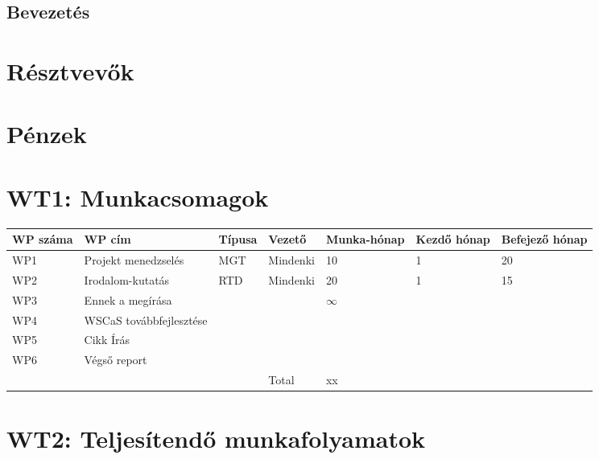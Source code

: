 \documentclass{report}
\begin{document}
\normalsize


\newpage
\subsection{Bevezetés}
\blindtext
\blindtext\blindtext\blindtext\blindtext\blindtext

\newpage
\section{Résztvevők}

\newpage
\section{Pénzek}

\newpage
\section*{WT1: Munkacsomagok}
\Large
\begin{tabular}{|p{}|p{}|p{}|p{}|p{}|p{}|p{}|}
\hline
\textbf{WP száma}  & \textbf{WP cím} & \textbf{Típusa} & \textbf{Vezető} & \textbf{Munka-hónap} & \textbf{Kezdő hónap} & \textbf{Befejező hónap} \\[3ex]
\hline
WP1 & Projekt menedzselés & MGT & Mindenki & 10 & 1 & 20 \\ [3ex]
\hline
WP2 & Irodalom-kutatás & RTD & Mindenki & 20 & 1 & 15 \\ [3ex]
\hline
WP3 & Ennek a megírása & & & $\infty$ & & \\ [3ex]
\hline
WP4 & WSCaS továbbfejlesztése & & & & & \\ [3ex]
\hline
WP5 & Cikk Írás & & & & & \\ [3ex]
\hline
WP6 & Végső report & & & & & \\ [3ex]
\hline
\multicolumn{3}{c|}{}& Total & xx & \multicolumn{2}{|c}{} \\ [3ex]
\cline{4-5}
\end{tabular}

\newpage
\section*{WT2: Teljesítendő munkafolyamatok}
\end{document}
